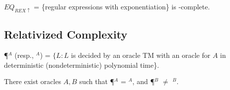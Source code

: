 \begin{theorem}
$EQ_{REX\uparrow}$ = \{regular expressions with exponentiation\} is \EXPSPACE-complete.
\end{theorem}

\subsection{Relativized Complexity}

\begin{definition}
\P$^A$ (resp., \NP$^A$) = $\{L : L$ is decided by an oracle TM with an oracle for $A$ in deterministic (nondeterministic) polynomial time\}.
\end{definition}

\begin{theorem}
\label{thm:relativizePandNP}
There exist oracles $A, B$ such that \P$^A$ = \NP$^A$, and \P$^B$ $\ne$ \NP$^B$.
\end{theorem}